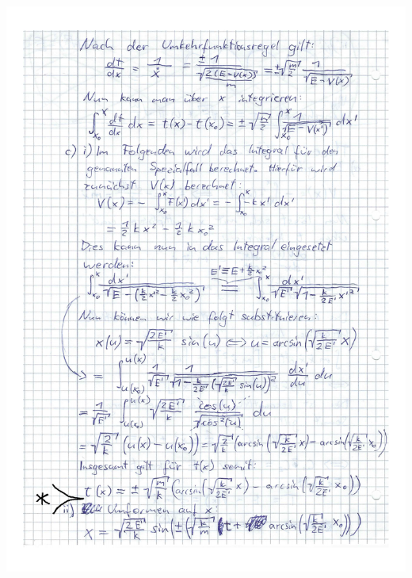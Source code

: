 \documentclass{theozettel}
\begin{document}
\begin{center}
\includegraphics[width=15cm]{A2-Teil2_annotated.pdf}\\

\end{center}
\end{document}
